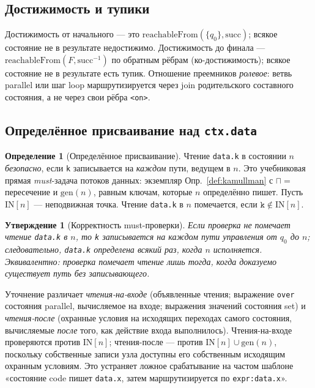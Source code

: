 \documentclass[11pt]{article}
\theoremstyle{plain}
\newtheorem{proposition}[theorem]{Утверждение}
\theoremstyle{definition}
\newtheorem{definition}[theorem]{Определение}
\theoremstyle{remark}
\newcommand{\code}[1]{\texttt{#1}}
\newcommand{\state}[1]{\textsf{#1}}
\newcommand{\meet}{\sqcap}
\begin{document}
\subsection{Достижимость и тупики}

Достижимость от начального --- это $\mathrm{reachableFrom}(\{q_0\}, \mathrm{succ})$; всякое
состояние не в результате недостижимо. Достижимость до финала ---
$\mathrm{reachableFrom}(F, \mathrm{succ}^{-1})$ по обратным рёбрам (ко-достижимость);
всякое состояние не в результате есть тупик. Отношение преемников \emph{ролевое}: ветвь
\state{parallel} или шаг \state{loop} маршрутизируется через join родительского
составного состояния, а не через свои рёбра \code{<on>}.

\subsection{Определённое присваивание над \code{ctx.data}}\label{sec:defassign}

\begin{definition}[Определённое присваивание]
Чтение \code{data.k} в состоянии $n$ \emph{безопасно}, если \code{k} записывается на
\emph{каждом} пути, ведущем в $n$. Это учебниковая прямая \emph{must}-задача потоков
данных: экземпляр Опр.~\ref{def:kamullman} с $\meet = {}$пересечение и $\mathrm{gen}(n)$,
равным ключам, которые $n$ определённо пишет. Пусть $\mathrm{IN}[n]$ --- неподвижная
точка. Чтение \code{data.k} в $n$ помечается, если $\code{k} \notin \mathrm{IN}[n]$.
\end{definition}

\begin{proposition}[Корректность must-проверки]
Если проверка не помечает чтение \code{data.k} в $n$, то \code{k} записывается на каждом
пути управления от $q_0$ до $n$; следовательно, \code{data.k} определена всякий раз, когда
$n$ исполняется. Эквивалентно: проверка помечает чтение лишь тогда, когда доказуемо
существует путь без записывающего.
\end{proposition}

Уточнение различает \emph{чтения-на-входе} (объявленные чтения; выражение \code{over}
состояния \state{parallel}, вычисляемое на входе; выражения значений состояния
\state{set}) и \emph{чтения-после} (охранные условия на исходящих переходах самого
состояния, вычисляемые \emph{после} того, как действие входа выполнилось). Чтения-на-входе
проверяются против $\mathrm{IN}[n]$; чтения-после --- против $\mathrm{IN}[n] \cup
\mathrm{gen}(n)$, поскольку собственные записи узла доступны его собственным исходящим
охранным условиям. Это устраняет ложное срабатывание на частом шаблоне «состояние
\state{code} пишет \code{data.x}, затем маршрутизируется по \code{expr:data.x}».
\end{document}
